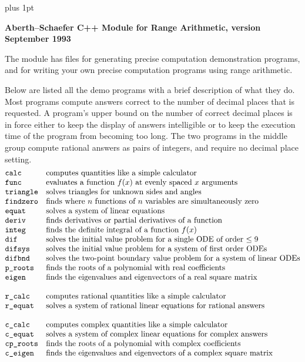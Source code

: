 \parskip 10pt plus 1pt
\def\_{\char'137} %
\def\^{\char'136} %
\def\~{\char'176} %
\def\pms{\raise.8ex\hbox{$\scriptscriptstyle+$}\kern-1.2ex
\raise.1ex\hbox{$\scriptscriptstyle-$}}
\def\t{\textstyle}
\def\s{\scriptstyle}
\def\oo#1#2{\t{\s#1\over\s#2}}
\def\section#1{\bigskip\bigskip\medskip\line{\bf #1 \hfil}\par}
\centerline{\bf Aberth--Schaefer C++ Module for Range Arithmetic,
version September 1993}
\bigskip
The module has files for generating precise computation demonstration 
programs, and for writing your own precise computation programs using
range arithmetic.

\section{Demonstration programs}
Below are listed all the demo programs with a brief description of what
they do. Most programs compute answers correct to the number of decimal
places that is requested.
A program's upper bound on
the number of correct decimal places is in force either to keep
the display of answers intelligible or to
keep the execution time of the program from becoming too long.
The two programs in the middle group compute rational answers as pairs
of integers, and require no decimal place setting.
$$\vbox{\halign{\tt#\hfil&\quad#\hfil\cr
calc&computes quantities like a simple calculator\cr
func&evaluates a function $f(x)$ at evenly spaced $x$ arguments\cr
triangle&solves triangles for unknown sides and angles\cr
findzero&finds where $n$ functions of $n$ variables are simultaneously zero\cr
equat&solves a system of linear equations\cr
deriv&finds derivatives or partial derivatives of a function\cr
integ&finds the definite integral of a function $f(x)$\cr
dif&solves the initial value problem for a single ODE of order $\leq 9$\cr
difsys&solves the initial value problem for a system of first order ODEs\cr
difbnd&solves the two-point boundary value problem for a system of
linear ODEs\cr
p\_ roots& finds the roots of a polynomial with real coefficients\cr
eigen&finds the eigenvalues and eigenvectors of a real square matrix\cr
\cr
r\_calc& computes rational quantities like a simple calculator\cr
r\_equat&solves a system of rational linear equations for rational answers\cr
\cr
c\_calc& computes complex quantities like a simple calculator\cr
c\_equat&solves a system of complex linear equations for complex answers\cr
cp\_ roots&finds the roots of a polynomial with complex coefficients\cr
c\_eigen&finds the eigenvalues and eigenvectors of a complex square matrix\cr
}}$$


